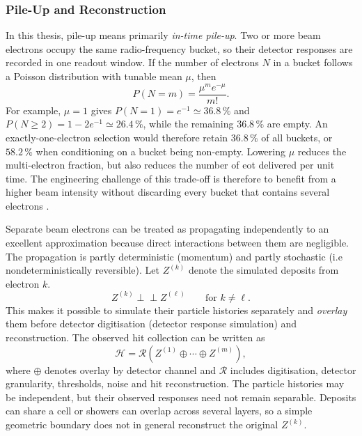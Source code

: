 \subsubsection{Pile-Up and Reconstruction}
\label{sec:formalism}
In this thesis, \gls{pile-up} means primarily \emph{in-time pile-up}. Two or
more beam electrons occupy the same radio-frequency bucket, so their detector
responses are recorded in one readout window. If the number of electrons
\(N\) in a bucket follows a Poisson distribution with tunable mean \(\mu\),
then
\begin{equation}
    P(N=m)=\frac{\mu^m e^{-\mu}}{m!}.
    \label{eq:poisson_bucket_multiplicity}
\end{equation}
For example, \(\mu=1\) gives \(P(N=1)=e^{-1}\simeq36.8\,\%\) and
\(P(N\geq2)=1-2e^{-1}\simeq26.4\,\%\), while the remaining
\(36.8\,\%\) are empty. An exactly-one-electron selection would therefore
retain \(36.8\,\%\) of all buckets, or \(58.2\,\%\) when conditioning on a
bucket being non-empty. Lowering \(\mu\) reduces the multi-electron fraction,
but also reduces the number of \gls{eot} delivered per unit time. The
engineering challenge of this trade-off is therefore to benefit from a higher beam intensity
without discarding every bucket that contains several electrons
\cite{ldmx2025-overview}.

Separate beam electrons can be treated as propagating independently to an
excellent approximation because direct interactions between them are
negligible. The propagation is partly deterministic (momentum) and partly stochastic (i.e nondeterministically reversible). Let \(Z^{(k)}\) denote the simulated deposits from electron \(k\).
\begin{equation}
    Z^{(k)} \perp\!\!\!\perp Z^{(\ell)}
    \qquad \text{for } k\neq\ell .
\end{equation}
This makes it possible to simulate their particle histories
separately and \textit{overlay} them before detector digitisation (detector response simulation) and reconstruction.
The
observed hit collection can be written as
\begin{equation}
    \mathcal{H}
    =
    \mathcal{R}\!\left(
        Z^{(1)}\oplus\cdots\oplus Z^{(m)}
    \right),
    \label{eq:pileup_detector_response}
\end{equation}
where \(\oplus\) denotes overlay by detector channel and \(\mathcal{R}\)
includes digitisation, detector granularity, thresholds, noise and hit
reconstruction. The particle histories may be independent, but their observed
responses need not remain separable. Deposits can share a cell or showers can
overlap across several layers, so a simple geometric boundary does not in
general reconstruct the original \(Z^{(k)}\).

